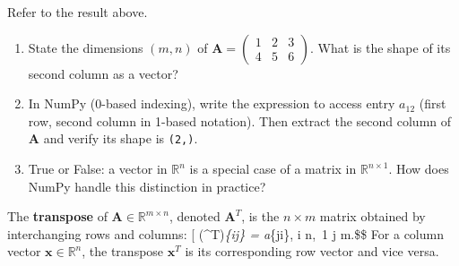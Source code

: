 \documentclass[
  letterpaper,
]{scrbook}
\newcommand{\fR}{\mathbb{R}}
\newcommand{\bx}{\boldsymbol{x}}
\newcommand{\bA}{\mathbf{A}}
\begin{document}
\begin{tcolorbox}[enhanced jigsaw, arc=.35mm, bottomrule=.15mm, bottomtitle=1mm, breakable, colback=white, colbacktitle=quarto-callout-warning-color!10!white, colframe=quarto-callout-warning-color-frame, coltitle=black, left=2mm, leftrule=.75mm, opacityback=0, opacitybacktitle=0.6, rightrule=.15mm, title={Exercise}, titlerule=0mm, toprule=.15mm, toptitle=1mm]

Refer to the result above.

\begin{enumerate}
\def\labelenumi{\arabic{enumi}.}
\item
  State the dimensions \((m, n)\) of
  \(\bA = \begin{pmatrix}1 & 2 & 3 \\ 4 & 5 & 6\end{pmatrix}\). What is
  the shape of its second column as a vector?
\item
  In NumPy (0-based indexing), write the expression to access entry
  \(a_{12}\) (first row, second column in 1-based notation). Then
  extract the second column of \(\bA\) and verify its shape is
  \texttt{(2,)}.
\item
  True or False: a vector in \(\fR^n\) is a special case of a matrix in
  \(\fR^{n \times 1}\). How does NumPy handle this distinction in
  practice?
\end{enumerate}

\end{tcolorbox}

\begin{tcolorbox}[enhanced jigsaw, arc=.35mm, bottomrule=.15mm, bottomtitle=1mm, breakable, colback=white, colbacktitle=quarto-callout-note-color!10!white, colframe=quarto-callout-note-color-frame, coltitle=black, left=2mm, leftrule=.75mm, opacityback=0, opacitybacktitle=0.6, rightrule=.15mm, title={Definition: Matrix Transpose}, titlerule=0mm, toprule=.15mm, toptitle=1mm]

The \textbf{transpose} of \(\bA \in \fR^{m \times n}\), denoted
\(\bA^T\), is the \(n \times m\) matrix obtained by interchanging rows
and columns: {[} (\bA\^{}T)\emph{\{ij\} = a}\{ji\},  \le i
\le n,~1 \le j \le m.\$\$ For a column vector \(\bx \in \fR^n\), the
transpose \(\bx^T\) is its corresponding row vector and vice versa.

\end{tcolorbox}
\end{document}

